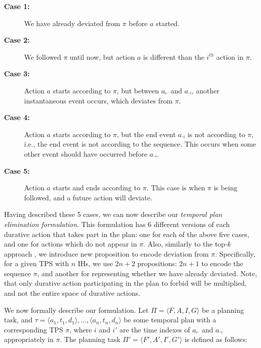 \begin{description}
\item[\textbf{Case 1:}] We have already deviated from $\pi$ before $a$ started. 
\item[\textbf{Case 2:}] We followed $\pi$ until now, but action $a$ is different than the $i^{th}$ action in $\pi$.
\item[\textbf{Case 3:}] Action $a$ starts according to $\pi$, but between $a_{\vdash}$ and  $a_{\dashv}$, another instantaneous event occurs, which deviates from $\pi$.
\item[\textbf{Case 4:}] Action $a$ starts according to $\pi$, but the end event $a_{\dashv}$ is not according to $\pi$, i.e., the end event is not according to the sequence. This occurs when some other event should have occurred before $a_{\dashv}$.
\item[\textbf{Case 5:}] Action $a$ starts and ends according to $\pi$. This case is when $\pi$ is being followed, and a future action will deviate.
\end{description}

Having described these 5 cases, we can now describe our {\em temporal plan elimination formulation}. This formulation has 6 different versions of each durative action that takes part in the plan: one for each of the above five cases, and one for actions which do not appear in $\pi$. Also, similarly to the top-$k$ approach \cite{katz2018novel}, we introduce new proposition to encode deviation from $\pi$. Specifically, for a given TPS with $n$ IHs, we use $2n+2$ propositions: $2n+1$ to encode the sequence $\pi$, and another for representing whether we have already deviated. Note, that only durative action participating in the plan to forbid will be multiplied, and not the entire space of durative actions.

We now formally describe our formulation. Let $\Pi = \langle F,A,I,G \rangle$ be a planning task, and $\tau = \langle a_1, t_1, d_1\rangle ,...,\langle a_n, t_n, d_n\rangle$ be some temporal plan with a corresponding TPS $\pi$, where $i$ and $i'$ are the time indexes of $a_{\vdash}$ and $a_{\dashv}$ appropriately in $\pi$. The planning task $\Pi' = \langle F', A', I', G'\rangle$ is defined as follows:

